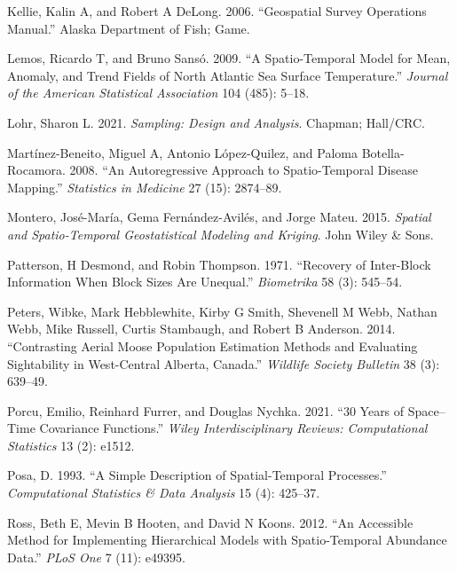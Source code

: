 \documentclass[]{article}    %
\newlength{\cslhangindent}
\newlength{\cslentryspacingunit} %
\newenvironment{CSLReferences}[2] %
 {%
  \setlength{\parindent}{0pt}
  \ifodd #1
  \let\oldpar\par
  \def\par{\hangindent=\cslhangindent\oldpar}
  \fi
  \setlength{\parskip}{#2\cslentryspacingunit}
 }%
 {}
\begin{document}
\begin{CSLReferences}{1}{0}
\leavevmode{}%
Kellie, Kalin A, and Robert A DeLong. 2006. {``Geospatial Survey
Operations Manual.''} Alaska Department of Fish; Game.

\leavevmode{}%
Lemos, Ricardo T, and Bruno Sansó. 2009. {``A Spatio-Temporal Model for
Mean, Anomaly, and Trend Fields of North Atlantic Sea Surface
Temperature.''} \emph{Journal of the American Statistical Association}
104 (485): 5--18.

\leavevmode{}%
Lohr, Sharon L. 2021. \emph{Sampling: Design and Analysis}. Chapman;
Hall/CRC.

\leavevmode{}%
Martínez-Beneito, Miguel A, Antonio López-Quilez, and Paloma
Botella-Rocamora. 2008. {``An Autoregressive Approach to Spatio-Temporal
Disease Mapping.''} \emph{Statistics in Medicine} 27 (15): 2874--89.

\leavevmode{}%
Montero, José-María, Gema Fernández-Avilés, and Jorge Mateu. 2015.
\emph{Spatial and Spatio-Temporal Geostatistical Modeling and Kriging}.
John Wiley \& Sons.

\leavevmode{}%
Patterson, H Desmond, and Robin Thompson. 1971. {``Recovery of
Inter-Block Information When Block Sizes Are Unequal.''}
\emph{Biometrika} 58 (3): 545--54.

\leavevmode{}%
Peters, Wibke, Mark Hebblewhite, Kirby G Smith, Shevenell M Webb, Nathan
Webb, Mike Russell, Curtis Stambaugh, and Robert B Anderson. 2014.
{``Contrasting Aerial Moose Population Estimation Methods and Evaluating
Sightability in West-Central Alberta, Canada.''} \emph{Wildlife Society
Bulletin} 38 (3): 639--49.

\leavevmode{}%
Porcu, Emilio, Reinhard Furrer, and Douglas Nychka. 2021. {``30 Years of
Space--Time Covariance Functions.''} \emph{Wiley Interdisciplinary
Reviews: Computational Statistics} 13 (2): e1512.

\leavevmode{}%
Posa, D. 1993. {``A Simple Description of Spatial-Temporal Processes.''}
\emph{Computational Statistics \& Data Analysis} 15 (4): 425--37.

\leavevmode{}%
Ross, Beth E, Mevin B Hooten, and David N Koons. 2012. {``An Accessible
Method for Implementing Hierarchical Models with Spatio-Temporal
Abundance Data.''} \emph{PLoS One} 7 (11): e49395.


\end{CSLReferences}
\end{document}
